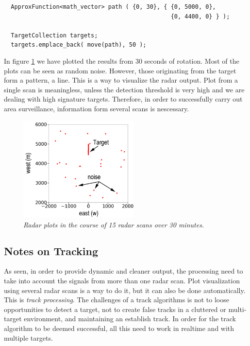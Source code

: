 \documentclass[letterpaper]{book}
\begin{document}
\begin{lstlisting}
  ApproxFunction<math_vector> path ( {0, 30}, { {0, 5000, 0},
                                                {0, 4400, 0} } );

  TargetCollection targets;
  targets.emplace_back( move(path), 50 );
\end{lstlisting}
In figure \ref{fig:multiple_scans} we have plotted the results from 30 seconds of rotation. Most of the plots can be seen as random noise. However, those originating from the target form a pattern, a line. This is a way to visualize the radar output. Plot from a single scan is meaningless, unless the detection threshold is very high and we are dealing with high signature targets. Therefore, in order to successfully carry out area surveillance, information form several scans is nescessary. 

\begin{figure}
  \includegraphics[width=6cm]{plot_scans.png}
  \caption{\textit{Radar plots in the course of 15 radar scans over 30 minutes.}}
  \label{fig:multiple_scans}
\end{figure}


\subsection{Notes on Tracking}
As seen, in order to provide dynamic and cleaner output, the processing need to take into account the signals from more than one radar scan. Plot visualization using several radar scans is a way to do it, but it can also be done automatically. This is \textit{track processing}. The challenges of a track algorithms is not to loose opportunities to detect a target, not to create false tracks in a cluttered or multi-target environment, and maintaining an establish track. In order for the track algorithm to be deemed successful, all this need to work in realtime and with multiple targets.
\end{document}
